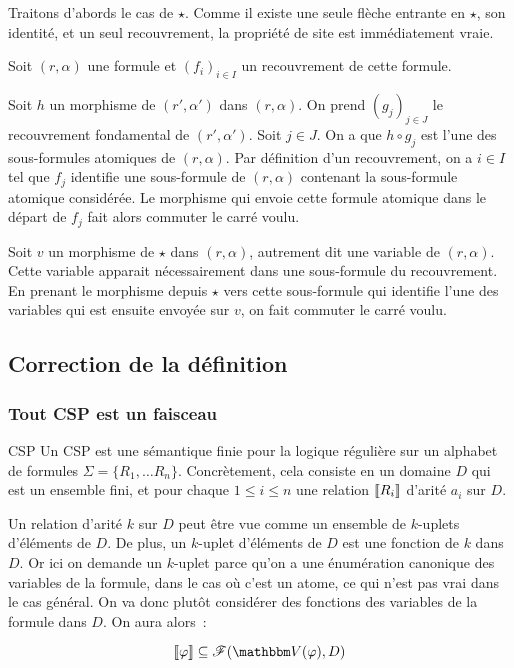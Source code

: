 \begin{pv}
    Traitons d'abords le cas de $\star$. Comme il existe une seule flèche
    entrante en $\star$, son identité, et un seul recouvrement, la propriété de
    site est immédiatement vraie.

    Soit $(r,\alpha)$ une formule et $(f_i)_{i\in I}$ un recouvrement de cette formule.
    
    Soit $h$ un morphisme de $(r', \alpha')$ dans $(r,\alpha)$. On prend
    $(g_j)_{j\in J}$ le recouvrement fondamental de $(r', \alpha')$. Soit $j\in
    J$. On a que $h\circ g_j$ est l'une des sous-formules atomiques de
    $(r,\alpha)$. Par définition d'un recouvrement, on a $i\in I$ tel que $f_j$
    identifie une sous-formule de $(r,\alpha)$ contenant la sous-formule
    atomique considérée. Le morphisme qui envoie cette formule atomique dans le
    départ de $f_j$ fait alors commuter le carré voulu.

    Soit $v$ un morphisme de $\star$ dans $(r,\alpha)$, autrement dit une
    variable de $(r,\alpha)$.  Cette variable apparait nécessairement dans une
    sous-formule du recouvrement. En prenant le morphisme depuis $\star$ vers
    cette sous-formule qui identifie l'une des variables qui est ensuite
    envoyée sur $v$, on fait commuter le carré voulu.
\end{pv}

\subsection{Correction de la définition}

\subsubsection{Tout CSP est un faisceau}

\begin{defi}{CSP}
    Un CSP est une sémantique finie pour la logique régulière sur un alphabet de formules 
    $\Sigma = \{R_1, \dots R_n\}$. Concrètement, cela consiste en un domaine $D$ qui est
    un ensemble fini, et pour chaque $1\leq i\leq n$ une relation $\llbracket {R_i} \rrbracket$
    d'arité $a_i$ sur $D$.
\end{defi}

\begin{rem}
    Un relation d'arité $k$ sur $D$ peut être vue comme un ensemble de $k$-uplets
    d'éléments de $D$. De plus, un $k$-uplet d'éléments de $D$ est une fonction de
    $k$ dans $D$. Or ici on demande un $k$-uplet parce qu'on a une énumération canonique
    des variables de la formule, dans le cas où c'est un atome, ce qui n'est pas vrai
    dans le cas général. On va donc plutôt considérer des fonctions des variables de
    la formule dans $D$. On aura alors~:

    \[ \sem{\phi}\subseteq \fns(\V(\phi), D) \]
\end{rem}

